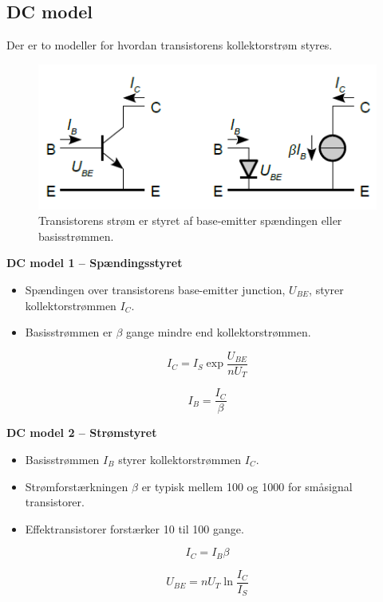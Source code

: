 \documentclass[danish]{article}
\begin{document}
\subsection{DC model}
Der er to modeller for hvordan transistorens kollektorstrøm styres.
\begin{figure} [H]
	\centering
	\includegraphics[width=0.6\linewidth]{graphics/transistor_DCmodel}
	\caption{Transistorens strøm er styret af base-emitter spændingen eller basisstrømmen.}
	\label{fig:transistor_DCmodel}
\end{figure}

\textbf{DC model 1 – Spændingsstyret}
\begin{itemize}
	\item Spændingen over transistorens base-emitter junction, $U_{BE}$, styrer kollektorstrømmen $I_C$.
	\item Basisstrømmen er ${\beta}$ gange mindre end kollektorstrømmen.
\end{itemize}

\begin{equation}
I_C = I_S \exp \dfrac{U_{BE}}{n U_T}
\end{equation}

\begin{equation}
I_B = \dfrac{I_C}{\beta}
\end{equation}

\textbf{DC model 2 – Strømstyret}
\begin{itemize}
	\item Basisstrømmen $I_B$ styrer kollektorstrømmen $I_C$.
	\item Strømforstærkningen ${\beta}$ er typisk mellem 100 og 1000 for småsignal transistorer.
	\item Effektransistorer forstærker 10 til 100 gange.
\end{itemize}
 
\begin{equation}
I_C = I_B {\beta}
\end{equation}

\begin{equation}
U_{BE} = n U_T \ln \dfrac{I_C}{I_S}
\end{equation}
\end{document}

